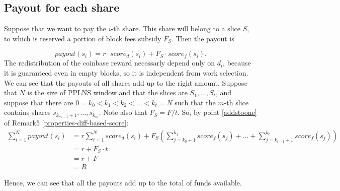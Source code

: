 \documentclass[11pt]{article}
\begin{document}
\subsection{Payout for each share}
Suppose that we want to pay the $i$-th share. This share will belong to a slice $S$, to which is reserved a portion of block fees subsidy $F_S$. Then the payout is

\[payout(s_i) = r\cdot score_d(s_i) + F_S \cdot score_f(s_i).\]
 The redistribution of the coinbase reward necessarly depend only on $d_i$, because it is guaranteed even in empty blocks, so it is independent from work selection.
We can see that the payouts of all shares add up to the right amount. Suppose that $N$ is the size of PPLNS window and that the slices are $S_1, \dots, S_t$, and suppose that there are $0=k_0<k_1< k_2< \dots < k_t=N$ such that the $m$-th slice contains shares $s_{k_{m-1}+1}, \dots, s_{k_{m}}$. Note also that $F_S = F/t$. So, by point \ref{addstoone} of Remark5 \ref{properties-diff-based-score}:
\begin{align*} 
\sum_{i=1} ^N payout(s_i) &= r\sum_{i=1}^N score_d(s_i) +F_{S}\left(\sum_{j=k_0+1}^{k_1} score_f(s_j)+\dots +\sum_{j=k_{t-1}+1}^{k_t} score_f(s_j)\right) \\
&= r +F_S\cdot t\\ &= r+F \\ &= R
\end{align*}

Hence, we can see that all the payouts add up to the total of funds available.
\end{document}
